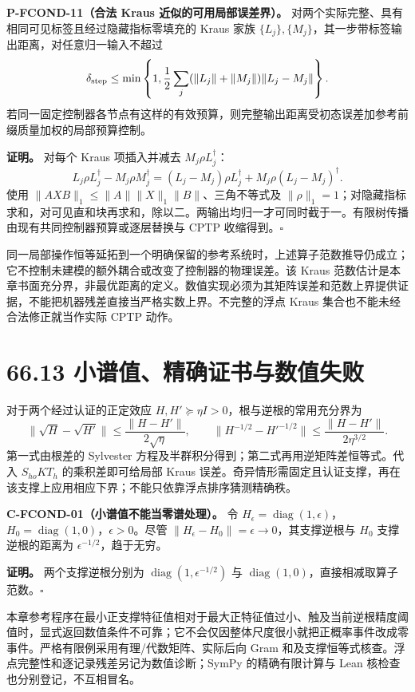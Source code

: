 \documentclass[
  11pt,
  oneside]{book}
\begin{document}
\protect\hypertarget{p-fcond-11}{}{} \textbf{P-FCOND-11（合法 Kraus
近似的可用局部误差界）。}
对两个实际完整、具有相同可见标签且经过隐藏指标零填充的 Kraus 家族
\(\{L_j\},\{M_j\}\)，其一步带标签输出距离，对任意归一输入不超过 \[
\delta_{\rm step}\le\min\left\{1,
\frac12\sum_j(\|L_j\|+\|M_j\|)\|L_j-M_j\|\right\}.
\]
若同一固定控制器各节点有这样的有效预算，则完整输出距离受初态误差加参考前缀质量加权的局部预算控制。

\textbf{证明。} 对每个 Kraus 项插入并减去 \(M_j\rho L_j^{\dagger}\)： \[
L_j\rho L_j^{\dagger}-M_j\rho M_j^{\dagger}
=(L_j-M_j)\rho L_j^{\dagger}
+M_j\rho(L_j-M_j)^{\dagger}.
\] 使用 \(\|AXB\|_1\le\|A\|\|X\|_1\|B\|\)、三角不等式及
\(\|\rho\|_1=1\)；对隐藏指标求和，对可见直和块再求和，除以二。两输出均归一才可同时截于一。有限树传播由现有共同控制器预算或逐层替换与
CPTP 收缩得到。\(\square\)

同一局部操作恒等延拓到一个明确保留的参考系统时，上述算子范数推导仍成立；它不控制未建模的额外耦合或改变了控制器的物理误差。该
Kraus
范数估计是本章书面充分界，非最优距离的定义。数值实现必须为其矩阵误差和范数上界提供证据，不能把机器残差直接当严格实数上界。不完整的浮点
Kraus 集合也不能未经合法修正就当作实际 CPTP 动作。

\section{66.13 小谱值、精确证书与数值失败}

对于两个经过认证的正定效应
\(H,H'\succeq\eta I>0\)，根与逆根的常用充分界为 \[
\|\sqrt H-\sqrt{H'}\|\le\frac{\|H-H'\|}{2\sqrt\eta},\qquad
\|H^{-1/2}-{H'}^{-1/2}\|\le
\frac{\|H-H'\|}{2\eta^{3/2}}.
\] 第一式由根差的 Sylvester
方程及半群积分得到；第二式再用逆矩阵差恒等式。代入 \(S_{ho}KT_h\)
的乘积差即可给局部 Kraus
误差。奇异情形需固定且认证支撑，再在该支撑上应用相应下界；不能只依靠浮点排序猜测精确秩。

\protect\hypertarget{c-fcond-01}{}{}
\textbf{C-FCOND-01（小谱值不能当零谱处理）。} 令
\(H_\epsilon=\operatorname{diag}(1,\epsilon)\)，\(H_0=\operatorname{diag}(1,0)\)，\(\epsilon>0\)。尽管
\(\|H_\epsilon-H_0\|=\epsilon\to0\)，其支撑逆根与 \(H_0\)
支撑逆根的距离为 \(\epsilon^{-1/2}\)，趋于无穷。

\textbf{证明。} 两个支撑逆根分别为
\(\operatorname{diag}(1,\epsilon^{-1/2})\) 与
\(\operatorname{diag}(1,0)\)，直接相减取算子范数。\(\square\)

本章参考程序在最小正支撑特征值相对于最大正特征值过小、触及当前逆根精度阈值时，显式返回数值条件不可靠；它不会仅因整体尺度很小就把正概率事件改成零事件。严格有限例采用有理/代数矩阵、实际后向
Gram 和及支撑恒等式核查。浮点完整性和逐记录残差另记为数值诊断；SymPy
的精确有限计算与 Lean 核检查也分别登记，不互相冒名。
\end{document}
